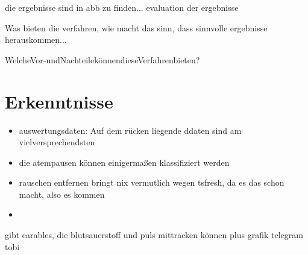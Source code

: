 die ergebnisse sind in abb zu finden... 
evaluation der ergebnisse

Was bieten die verfahren, wie macht das sinn, dass sinnvolle ergebnisse herauskommen...

WelcheVor-undNachteilekönnendieseVerfahrenbieten?

\section{Erkenntnisse}
\begin{itemize}
    \item auswertungsdaten: Auf dem rücken liegende ddaten sind am vielversprechendsten
    \item die atempausen können einigermaßen klassifiziert werden
    \item rauschen entfernen bringt nix vermutlich wegen tsfresh, da es das schon macht, also es kommen
    \item 
\end{itemize}

gibt earables, die blutsauerstoff und puls mittracken können
plus grafik telegram tobi
